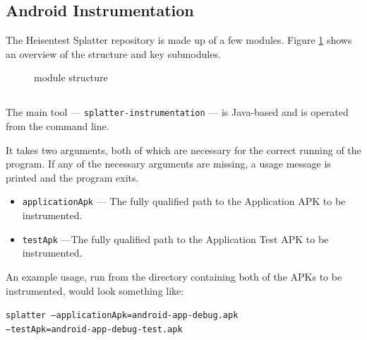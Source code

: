 \subsection{Android Instrumentation}

The Heisentest Splatter repository\cite{heisentestInstrumentation} is made up of a few modules. Figure \ref{fig:repo_structure} shows an overview of the structure and key submodules.

\begin{figure}[h]
\caption{\heisentest{} module structure}
\label{fig:repo_structure}
\end{figure}

\subsection{\splatterinst{}}

The main tool --- {\tt splatter-instrumentation} --- is Java-based and is operated from the command line.

It takes two arguments, both of which are necessary for the correct running of the program. If any of the necessary arguments are missing, a usage message is printed and the program exits.

\begin{itemize}
    \item \texttt{applicationApk} --- The fully qualified path to the Application APK to be instrumented.
    \item \texttt{testApk} ---The fully qualified path to the Application Test APK to be instrumented.
\end{itemize}

An example usage, run from the directory containing both of the APKs to be instrumented, would look something like:

\texttt{splatter --applicationApk=android-app-debug.apk\\--testApk=android-app-debug-test.apk}

